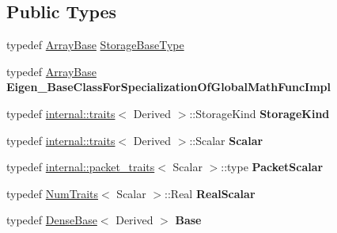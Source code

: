 \subsection*{Public Types}
\begin{DoxyCompactItemize}
\item 
typedef \mbox{\hyperlink{class_eigen_1_1_array_base}{Array\+Base}} \mbox{\hyperlink{class_eigen_1_1_array_base_a7c296f02281624d9c76eb864ab7209ce}{Storage\+Base\+Type}}
\item 
\mbox{\label{class_eigen_1_1_array_base_a31e98eccecba8ce3d219fd64d16132d8}} 
typedef \mbox{\hyperlink{class_eigen_1_1_array_base}{Array\+Base}} {\bfseries Eigen\+\_\+\+Base\+Class\+For\+Specialization\+Of\+Global\+Math\+Func\+Impl}
\item 
\mbox{\label{class_eigen_1_1_array_base_a6d90135958acf6f7e1c40277ea7da2b7}} 
typedef \mbox{\hyperlink{struct_eigen_1_1internal_1_1traits}{internal\+::traits}}$<$ Derived $>$\+::Storage\+Kind {\bfseries Storage\+Kind}
\item 
\mbox{\label{class_eigen_1_1_array_base_a9d10903d33b230df8226b2adc0179c41}} 
typedef \mbox{\hyperlink{struct_eigen_1_1internal_1_1traits}{internal\+::traits}}$<$ Derived $>$\+::Scalar {\bfseries Scalar}
\item 
\mbox{\label{class_eigen_1_1_array_base_a975bd48834ec3cb1c8436d3475b71939}} 
typedef \mbox{\hyperlink{struct_eigen_1_1internal_1_1packet__traits}{internal\+::packet\+\_\+traits}}$<$ Scalar $>$\+::type {\bfseries Packet\+Scalar}
\item 
\mbox{\label{class_eigen_1_1_array_base_a33fdf1119ee1107d1e1905e624ca6e24}} 
typedef \mbox{\hyperlink{struct_eigen_1_1_num_traits}{Num\+Traits}}$<$ Scalar $>$\+::Real {\bfseries Real\+Scalar}
\item 
\mbox{\label{class_eigen_1_1_array_base_a1591f6f51796e6451a919c36431219a9}} 
typedef \mbox{\hyperlink{class_eigen_1_1_dense_base}{Dense\+Base}}$<$ Derived $>$ {\bfseries Base}
\item 
\mbox{\label{class_eigen_1_1_array_base_aa9ee5eebe5ab23a22c8a8baeab8885e1}} 

\end{DoxyCompactItemize}
